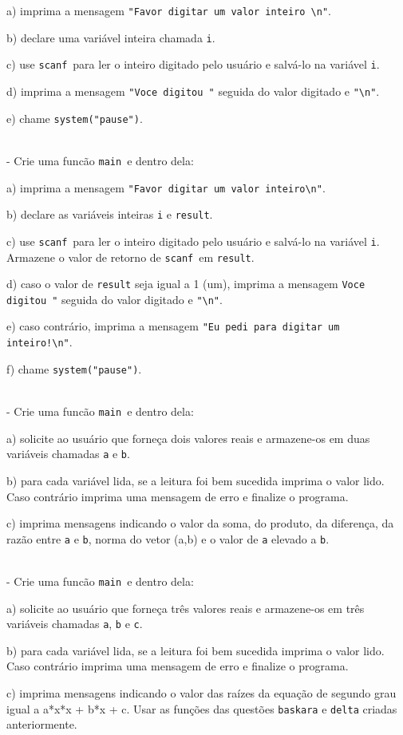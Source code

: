 \documentclass{book}
\newcommand{\NEWLINE}{~\\}
\newcommand{\MAIN}{{\tt main}}
\newcommand{\SCANF}{{\tt scanf}}
\begin{document}
a) imprima a mensagem \verb|"Favor digitar um valor inteiro \n"|.

b) declare uma variável inteira chamada {\tt i}.

c) use \SCANF\ para ler o inteiro digitado pelo usuário e salvá-lo na variável {\tt i}.

d) imprima a mensagem \verb|"Voce digitou "| seguida do valor digitado e \verb|"\n"|.

e) chame \verb|system("pause")|.

\NEWLINE
\quest - Crie uma funcão \MAIN\ e dentro dela:

a) imprima a mensagem \verb|"Favor digitar um valor inteiro\n"|.

b) declare as variáveis inteiras {\tt i} e {\tt result}.

c) use \SCANF\ para ler o inteiro digitado pelo usuário e salvá-lo na variável {\tt i}. Armazene o valor de retorno de \SCANF\ em {\tt result}.

d) caso o valor de {\tt result} seja igual a 1 (um), imprima a mensagem \verb|Voce digitou "| seguida do valor digitado e \verb|"\n"|.

e) caso contrário, imprima a mensagem \verb|"Eu pedi para digitar um inteiro!\n"|.

f) chame \verb|system("pause")|.

\NEWLINE
\quest - Crie uma funcão \MAIN\ e dentro dela:

a) solicite ao usuário que forneça dois valores reais e armazene-os em duas variáveis chamadas {\tt a} e {\tt b}.

b) para cada variável lida, se a leitura foi bem sucedida imprima o valor lido. Caso contrário imprima uma mensagem de erro e finalize o programa.

c) imprima mensagens indicando o valor da soma, do produto, da diferença, da razão entre {\tt a} e {\tt b}, norma do vetor (a,b) e o valor de {\tt a} elevado a {\tt b}.

\NEWLINE
\quest - Crie uma funcão \MAIN\ e dentro dela:

a) solicite ao usuário que forneça três valores reais e armazene-os em três variáveis chamadas {\tt a}, {\tt b} e {\tt c}.

b) para cada variável lida, se a leitura foi bem sucedida imprima o valor lido. Caso contrário imprima uma mensagem de erro e finalize o programa.

c) imprima mensagens indicando o valor das raízes da equação de segundo grau igual a a*x*x + b*x + c. Usar as funções das questões {\tt baskara} e {\tt delta} criadas anteriormente.
\end{document}
